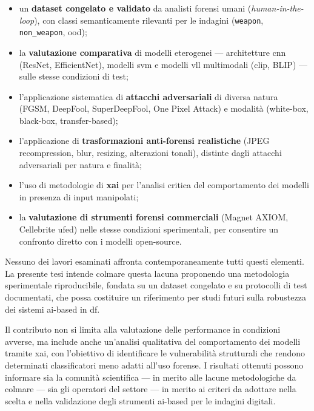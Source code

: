 \begin{itemize}
    \item un \textbf{dataset congelato e validato} da analisti forensi umani (\textit{human-in-the-loop}), con classi semanticamente rilevanti per le indagini (\texttt{weapon}, \texttt{non\_weapon}, \gls{ood});
    \item la \textbf{valutazione comparativa} di modelli eterogenei — architetture \gls{cnn} (ResNet, EfficientNet), modelli \gls{svm} e modelli \gls{vll} multimodali (\gls{clip}, BLIP) — sulle stesse condizioni di test;
    \item l'applicazione sistematica di \textbf{attacchi adversariali} di diversa natura (FGSM, DeepFool, SuperDeepFool, One Pixel Attack) e modalità (white-box, black-box, transfer-based);
    \item l'applicazione di \textbf{trasformazioni anti-forensi realistiche} (JPEG recompression, blur, resizing, alterazioni tonali), distinte dagli attacchi adversariali per natura e finalità;
    \item l'uso di metodologie di \textbf{\gls{xai}} per l'analisi critica del comportamento dei modelli in presenza di input manipolati;
    \item la \textbf{valutazione di strumenti forensi commerciali} (Magnet AXIOM, Cellebrite \gls{ufed}) nelle stesse condizioni sperimentali, per consentire un confronto diretto con i modelli open-source.
\end{itemize}

Nessuno dei lavori esaminati affronta contemporaneamente tutti questi elementi. La presente tesi intende colmare questa lacuna proponendo una metodologia sperimentale riproducibile, fondata su un dataset congelato e su protocolli di test documentati, che possa costituire un riferimento per studi futuri sulla robustezza dei sistemi \gls{ai}-based in \gls{df}.

Il contributo non si limita alla valutazione delle performance in condizioni avverse, ma include anche un'analisi qualitativa del comportamento dei modelli tramite \gls{xai}, con l'obiettivo di identificare le vulnerabilità strutturali che rendono determinati classificatori meno adatti all'uso forense. I risultati ottenuti possono informare sia la comunità scientifica — in merito alle lacune metodologiche da colmare — sia gli operatori del settore — in merito ai criteri da adottare nella scelta e nella validazione degli strumenti \gls{ai}-based per le indagini digitali.
